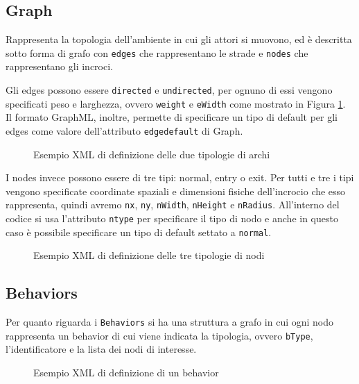 \subsection{Graph} 

Rappresenta la topologia dell'ambiente in cui gli attori si muovono, ed è descritta sotto forma di grafo con \texttt{edges} che rappresentano le strade e \texttt{nodes} che rappresentano gli incroci.

Gli edges possono essere \texttt{directed} e \texttt{undirected}, per ognuno di essi vengono specificati peso e larghezza, ovvero \texttt{weight} e \texttt{eWidth} come mostrato in Figura \ref{fig:xml-edges}. Il formato GraphML, inoltre, permette di specificare un tipo di default per gli edges come valore dell'attributo \texttt{edgedefault} di Graph.
\begin{figure}[htbp]
\centering
\label{fig:xml-edges}
\caption{Esempio XML di definizione delle due tipologie di archi}
\end{figure}

I nodes invece possono essere di tre tipi: normal, entry o exit. Per tutti e tre i tipi vengono specificate coordinate spaziali e dimensioni fisiche dell'incrocio che esso rappresenta, quindi avremo \texttt{nx}, \texttt{ny}, \texttt{nWidth}, \texttt{nHeight} e \texttt{nRadius}. All'interno del codice si usa l'attributo \texttt{ntype} per specificare il tipo di nodo e anche in questo caso è possibile specificare un tipo di default settato a \texttt{normal}.
\begin{figure}[htbp]
\centering
\label{fig:xml-nodes}

\caption{Esempio XML di definizione delle tre tipologie di nodi}
\end{figure}


\subsection{Behaviors}

Per quanto riguarda i \texttt{Behaviors} si ha una struttura a grafo in cui ogni nodo rappresenta un behavior di cui viene indicata la tipologia, ovvero \texttt{bType}, l'identificatore e la lista dei nodi di interesse.

\begin{figure}[htbp]
\centering
\label{fig:xml-behaviors}
\caption{Esempio XML di definizione di un behavior}
\end{figure}


